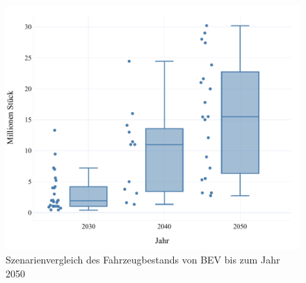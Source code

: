 \begin{figure}[H]
    \centering
    \includegraphics[width=\textwidth]{Bilder/RampUp-BEV-MA}
    \caption{Szenarienvergleich des Fahrzeugbestands von BEV bis zum Jahr \num{2050}}\label{fig:RampUpBEV}
\end{figure}